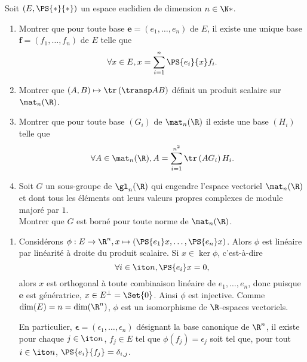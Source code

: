\begin{enonce}
\begin{exercise}[ID={RMS 116-4 E938, Centrale PC 2005},subtitle={},tags={}, difficulty={0}]
Soit $\left( E,\PS{*}{*} \right)$ un espace euclidien de dimension $n\in\N*$.
\begin{enumerate}
\item 
  Montrer que pour toute base $\bm e=\left( e_1,\dotsc,e_n \right)$ de $E$, il existe une unique base $\bm f=\left( f_1,\dotsc,f_n \right)$ de $E$ telle que
  \begin{equation}
    \forall x\in E, x=\sum_{i=1}^n \PS{e_i}{x} f_i.
  \end{equation}
\item Montrer que $(A,B)\mapsto \tr\left( \transp AB \right)$ définit un produit scalaire sur $\mat_n(\R)$.
\item Montrer que pour toute base $\left( G_i \right)$ de $\mat_n(\R)$ il existe une base $(H_i)$ telle que
  \begin{equation}
    \forall A\in\mat_n(\R), A= \sum_{i=1}^{n^2} \tr\left( A G_i \right) H_i.
  \end{equation}
\item
  Soit $G$ un sous-groupe de $\gl_n(\R)$ qui engendre l'espace vectoriel  $\mat_n(\R)$ et dont tous les éléments ont leurs valeurs propres complexes de module majoré par $1$.\\
  Montrer que $G$ est borné pour toute norme de $\mat_n(\R)$.
\end{enumerate}
\end{exercise}
\begin{solution}
\begin{enumerate}
\item 
  Considérons $\phi:E\to\R^n, x\mapsto\left( \PS{e_1}x,\dotsc,\PS{e_n}x \right)$.
  Alors $\phi$ est linéaire par linéarité à droite du produit scalaire.
  Si $x\in\ker\phi$, c'est-à-dire 
  \begin{equation*}
    \forall i\in\ito n, \PS{e_i}x=0,
  \end{equation*}
  alors $x$ est orthogonal à toute combinaison linéaire de $e_1,\dotsc,e_n$, donc puisque $\bm e$ est génératrice, $x\in E^\perp=\Set{0}$.
  Ainsi $\phi$ est injective.
  Comme $\dim(E)=n=\dim(\R^n)$, $\phi$ est un isomorphisme de $\R$-espaces vectoriels.

  En particulier, $\bm\epsilon=\left( \epsilon_1,\dotsc,\epsilon_n \right)$ désignant la base canonique de $\R^n$, il existe pour chaque $j\in\ito n$, $f_j\in E$ tel que $\phi(f_j)=\epsilon_j$ soit tel que, pour tout $i\in\ito n$, $\PS{e_i}{f_j}=\delta_{i,j}$.


\end{enumerate}
\end{solution}
\end{enonce}
